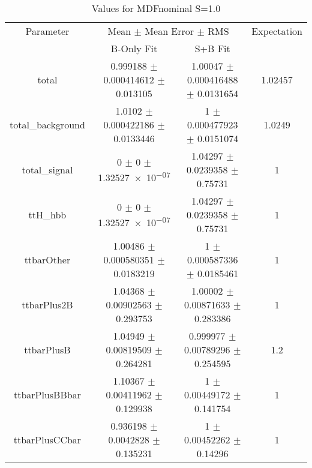 \begin{table}
\centering
\caption{Values for MDFnominal S=1.0}
\begin{tabular}{cccc}
\toprule
Parameter & \multicolumn{2}{c}{Mean $\pm$ Mean Error $\pm$ RMS} & Expectation\\
 & B-Only Fit & S+B Fit & \\
\midrule
total & \num{0.999188} $\pm$ \num{0.000414612} $\pm$ \num{0.013105} & \num{1.00047} $\pm$ \num{0.000416488} $\pm$ \num{0.0131654} & \num{1.02457}\\
total\_background & \num{1.0102} $\pm$ \num{0.000422186} $\pm$ \num{0.0133446} & \num{1} $\pm$ \num{0.000477923} $\pm$ \num{0.0151074} & \num{1.0249}\\
total\_signal & \num{0} $\pm$ \num{0} $\pm$ \num{1.32527e-07} & \num{1.04297} $\pm$ \num{0.0239358} $\pm$ \num{0.75731} & \num{1}\\
ttH\_hbb & \num{0} $\pm$ \num{0} $\pm$ \num{1.32527e-07} & \num{1.04297} $\pm$ \num{0.0239358} $\pm$ \num{0.75731} & \num{1}\\
ttbarOther & \num{1.00486} $\pm$ \num{0.000580351} $\pm$ \num{0.0183219} & \num{1} $\pm$ \num{0.000587336} $\pm$ \num{0.0185461} & \num{1}\\
ttbarPlus2B & \num{1.04368} $\pm$ \num{0.00902563} $\pm$ \num{0.293753} & \num{1.00002} $\pm$ \num{0.00871633} $\pm$ \num{0.283386} & \num{1}\\
ttbarPlusB & \num{1.04949} $\pm$ \num{0.00819509} $\pm$ \num{0.264281} & \num{0.999977} $\pm$ \num{0.00789296} $\pm$ \num{0.254595} & \num{1.2}\\
ttbarPlusBBbar & \num{1.10367} $\pm$ \num{0.00411962} $\pm$ \num{0.129938} & \num{1} $\pm$ \num{0.00449172} $\pm$ \num{0.141754} & \num{1}\\
ttbarPlusCCbar & \num{0.936198} $\pm$ \num{0.0042828} $\pm$ \num{0.135231} & \num{1} $\pm$ \num{0.00452262} $\pm$ \num{0.14296} & \num{1}\\
\bottomrule
\end{tabular}
\end{table}